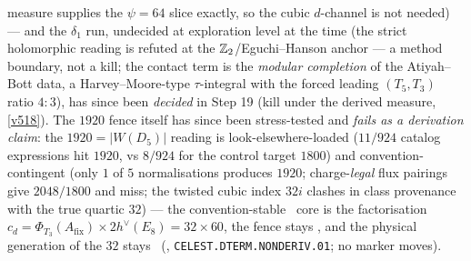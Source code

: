 measure supplies the $\psi=64$ slice exactly, so the cubic $d$-channel is not needed) --- and
the $\delta_1$ run, undecided at exploration level at the time
(the strict holomorphic reading is refuted at the $\mathbb{Z}_2$/Eguchi--Hanson anchor --- a method
boundary, not a kill; the contact term is the \emph{modular completion} of the Atiyah--Bott data,
a Harvey--Moore-type $\tau$-integral with the forced leading $(T_5,T_3)$ ratio $4{:}3$), has
since been \emph{decided} in Step 19 (kill under the derived measure, \vref{v518}).
The $1920$ fence itself has since been stress-tested and \emph{fails as a derivation claim}: the
$1920=|W(D_5)|$ reading is look-elsewhere-loaded ($11/924$ catalog expressions hit $1920$, vs
$8/924$ for the control target $1800$) and convention-contingent (only $1$ of $5$ normalisations
produces $1920$; charge-\emph{legal} flux pairings give $2048/1800$ and miss; the twisted cubic
index $32i$ clashes in class provenance with the true quartic $32$) --- the convention-stable
\mE\ core is the factorisation $c_d=\Phi_{T_3}(A_{\mathrm{fix}})\times2h^\vee(E_8)=32\times60$,
the fence stays \mC, and the physical generation of the $32$ stays \mO\
(, \texttt{CELEST.DTERM.NONDERIV.01}; no marker
moves).

